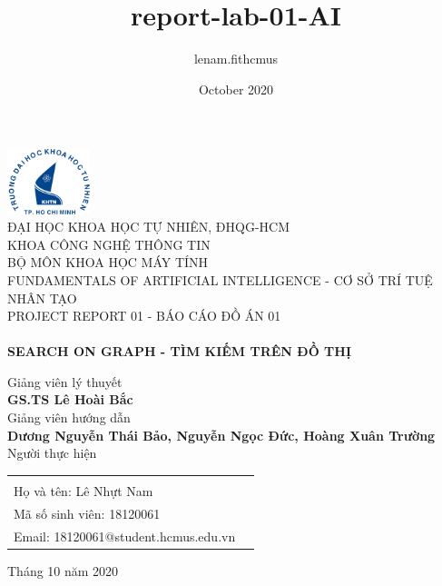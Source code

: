 \documentclass{article}
\title{report-lab-01-AI}
\author{lenam.fithcmus }
\date{October 2020}
\begin{document}
\begin{titlepage}

\begin{center}

\includegraphics[width=0.18\textwidth]{hcmus.png}\\[0.1in]
\large{ĐẠI HỌC KHOA HỌC TỰ NHIÊN, ĐHQG-HCM\\KHOA CÔNG NGHỆ THÔNG TIN\\BỘ MÔN KHOA HỌC MÁY TÍNH}\\
\normalsize
\vspace{2cm}
\textup{\large {FUNDAMENTALS OF ARTIFICIAL INTELLIGENCE - CƠ SỞ TRÍ TUỆ NHÂN TẠO} \\ \Large PROJECT REPORT 01 - BÁO CÁO ĐỒ ÁN 01}\\[0.2in]

\huge \textbf {\\SEARCH ON GRAPH - TÌM KIẾM TRÊN ĐỒ THỊ}\\[0.2in]
\normalsize
{}
\newline
\normalsize
Giảng viên lý thuyết\\
{\textbf{GS.TS Lê Hoài Bắc}}\\[0.1in]
Giảng viên hướng dẫn\\
{\textbf{Dương Nguyễn Thái Bảo, Nguyễn Ngọc Đức, Hoàng Xuân Trường}}\\[0.2in]
Người thực hiện \\
\begin{table}[h]
\centering
\begin{tabular}{lr}\hline \\
Họ và tên: Lê Nhựt Nam\\
Mã số sinh viên: 18120061\\
Email: 18120061@student.hcmus.edu.vn\\
\hline
\end{tabular}
\end{table}
\vspace{0.2in}

\vfill
Tháng 10 năm 2020
\end{center}
\end{titlepage}
\newpage
\end{document}
